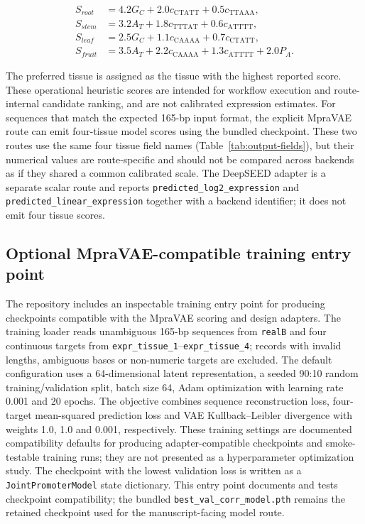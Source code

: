 \documentclass[10pt]{article}
\begin{document}
\[
\begin{aligned}
S_{root} &= 4.2G_C + 2.0c_{\mathrm{CTATT}} + 0.5c_{\mathrm{TTAAA}},\\
S_{stem} &= 3.2A_T + 1.8c_{\mathrm{TTTAT}} + 0.6c_{\mathrm{ATTTT}},\\
S_{leaf} &= 2.5G_C + 1.1c_{\mathrm{CAAAA}} + 0.7c_{\mathrm{CTATT}},\\
S_{fruit} &= 3.5A_T + 2.2c_{\mathrm{CAAAA}} + 1.3c_{\mathrm{ATTTT}} + 2.0P_A.
\end{aligned}
\]

The preferred tissue is assigned as the tissue with the highest reported score. These operational heuristic scores are intended for workflow execution and route-internal candidate ranking, and are not calibrated expression estimates. For sequences that match the expected 165-bp input format, the explicit MpraVAE route can emit four-tissue model scores using the bundled checkpoint. These two routes use the same four tissue field names (Table~\ref{tab:output-fields}), but their numerical values are route-specific and should not be compared across backends as if they shared a common calibrated scale. The DeepSEED adapter is a separate scalar route and reports \texttt{predicted\_log2\_expression} and \texttt{predicted\_linear\_expression} together with a backend identifier; it does not emit four tissue scores.

\subsection{Optional MpraVAE-compatible training entry point}

The repository includes an inspectable training entry point for producing checkpoints compatible with the MpraVAE scoring and design adapters. The training loader reads unambiguous 165-bp sequences from \texttt{realB} and four continuous targets from \texttt{expr\_tissue\_1}--\texttt{expr\_tissue\_4}; records with invalid lengths, ambiguous bases or non-numeric targets are excluded. The default configuration uses a 64-dimensional latent representation, a seeded 90:10 random training/validation split, batch size 64, Adam optimization with learning rate 0.001 and 20 epochs. The objective combines sequence reconstruction loss, four-target mean-squared prediction loss and VAE Kullback--Leibler divergence with weights 1.0, 1.0 and 0.001, respectively. These training settings are documented compatibility defaults for producing adapter-compatible checkpoints and smoke-testable training runs; they are not presented as a hyperparameter optimization study. The checkpoint with the lowest validation loss is written as a \texttt{JointPromoterModel} state dictionary. This entry point documents and tests checkpoint compatibility; the bundled \texttt{best\_val\_corr\_model.pth} remains the retained checkpoint used for the manuscript-facing model route.
\end{document}
